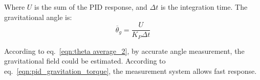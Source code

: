\documentclass[\main/master.tex]{subfiles}
\begin{document}
Where $U$ is the sum of the PID response, and $\Delta t$ is the integration time. The gravitational angle is:
\begin{equation}
\overline{\theta}_g = \frac{U}{K_P\Delta t}      \label{eqn:pid_gravitation_torque}
\end{equation}
\par\noindent
According to eq.~\ref{eqn:theta average_2}, by accurate angle measurement, the gravitational field could be estimated. According to eq.~\ref{eqn:pid_gravitation_torque}, the measurement system allows fast response. 

 
 
 
 
\end{document}
